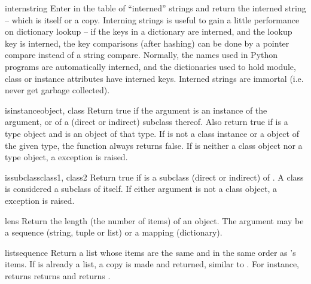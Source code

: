 \begin{funcdesc}{intern}{string}
  Enter  in the table of ``interned'' strings and return
  the interned string -- which is  itself or a copy.
  Interning strings is useful to gain a little performance on
  dictionary lookup -- if the keys in a dictionary are interned, and
  the lookup key is interned, the key comparisons (after hashing) can
  be done by a pointer compare instead of a string compare.  Normally,
  the names used in Python programs are automatically interned, and
  the dictionaries used to hold module, class or instance attributes
  have interned keys.  Interned strings are immortal (i.e. never get
  garbage collected).
\end{funcdesc}

\begin{funcdesc}{isinstance}{object, class}
Return true if the  argument is an instance of the
 argument, or of a (direct or indirect) subclass thereof.
Also return true if  is a type object and  is
an object of that type.  If  is not a class instance or a
object of the given type, the function always returns false.  If
 is neither a class object nor a type object, a
 exception is raised.
\end{funcdesc}

\begin{funcdesc}{issubclass}{class1, class2}
Return true if  is a subclass (direct or indirect) of
.  A class is considered a subclass of itself.  If either
argument is not a class object, a  exception is
raised.
\end{funcdesc}

\begin{funcdesc}{len}{s}
  Return the length (the number of items) of an object.  The argument
  may be a sequence (string, tuple or list) or a mapping (dictionary).
\end{funcdesc}

\begin{funcdesc}{list}{sequence}
Return a list whose items are the same and in the same order as
's items.  If  is already a list,
a copy is made and returned, similar to .  
For instance,  returns
returns \code{['a', 'b', 'c']} and  returns
\code{[1, 2, 3]}.
\end{funcdesc}

